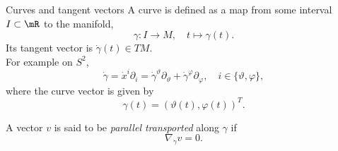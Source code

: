\begin{mybox}{Curves and tangent vectors}
	A curve \gamma is defined as a map from some interval $I \subset \mR$ to the manifold,\begin{equation}
		\gamma: I \rightarrow M, \quad t \mapsto \gamma(t).
	\end{equation}
	Its tangent vector is $\dot{\gamma}(t) \in TM$.\\
	For example on $S^2$, 
	\begin{equation}
	\dot{\gamma} = \dot{x}^i \partial_i = \dot{\gamma}^{\vartheta} \partial_{\vartheta} + \dot{\gamma}^{\varphi} \partial_{\varphi}, \quad i\in \{\vartheta, \varphi\},
	\end{equation}
	where the curve vector is given by 
	\begin{equation}
		\gamma (t) = (\vartheta(t), \varphi(t))^T.
	\end{equation}
\end{mybox}
A vector $v$ is said to be \emph{parallel transported} along $\gamma$ if
\begin{equation}
	\nabla_{\dot{\gamma}} v = 0.
\end{equation}
